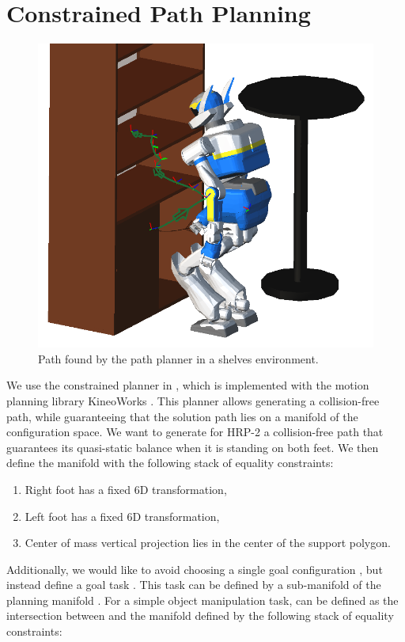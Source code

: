 \section{Constrained Path Planning}
\label{path-planning}

\begin{figure}
\centering
\includegraphics[width=0.8\linewidth]
                {src/chap3-optimal-motion-planning/figure/shelves-path.png}
\caption{Path found by the path planner in a shelves environment.}
\label{path}
\end{figure}

We use the constrained planner in \cite{dali09}, which is
implemented with the motion planning library KineoWorks\texttrademark
\cite{Laumond2006}. This planner allows generating a collision-free
path, while guaranteeing that the solution path lies on a manifold of
the configuration space. We want to generate for HRP-2 a
collision-free path that guarantees its quasi-static balance when it
is standing on both feet. We then define the manifold \manifold
with the following stack of equality constraints:

\begin{enumerate}
  \item Right foot has a fixed 6D transformation,
  \item Left foot has a fixed 6D transformation,
  \item Center of mass vertical projection lies in the center of the
    support polygon.
\end{enumerate}

Additionally, we would like to avoid choosing a single goal
configuration , but instead define a goal task
. This task can be defined by a sub-manifold
\goalmanifold\thinspace of the planning manifold \manifold. For a
simple object manipulation task, \goalmanifold\thinspace can be
defined as the intersection between \manifold\thinspace and the
manifold defined by the following stack of equality constraints:

